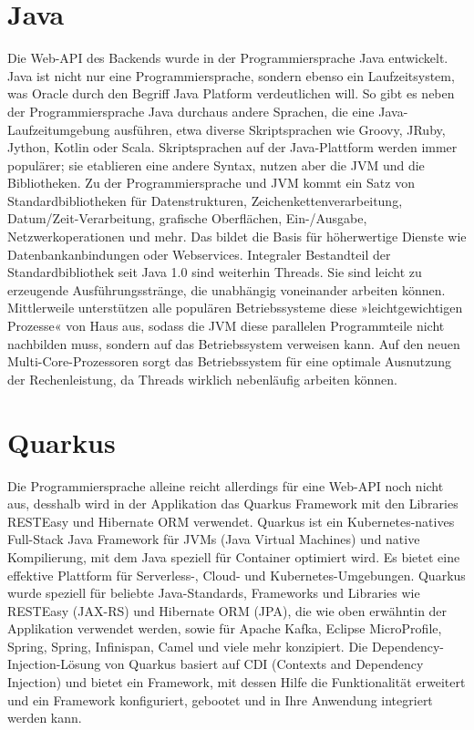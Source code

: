 \section{Java}

Die Web-API des Backends wurde in der Programmiersprache Java entwickelt.
Java ist nicht nur eine Programmiersprache, sondern ebenso ein Laufzeitsystem, was Oracle durch den Begriff Java Platform verdeutlichen will. 
So gibt es neben der Programmiersprache Java durchaus andere Sprachen, die eine Java-Laufzeitumgebung ausführen, etwa diverse Skriptsprachen wie 
Groovy, JRuby, Jython, Kotlin oder Scala. Skriptsprachen auf der Java-Plattform werden immer populärer; sie etablieren eine andere Syntax, nutzen aber die JVM und die Bibliotheken.
Zu der Programmiersprache und JVM kommt ein Satz von Standardbibliotheken für Datenstrukturen, Zeichenkettenverarbeitung, Datum/Zeit-Verarbeitung, grafische Oberflächen, 
Ein-/Ausgabe, Netzwerkoperationen und mehr. Das bildet die Basis für höherwertige Dienste wie Datenbankanbindungen oder Webservices. Integraler Bestandteil der Standardbibliothek 
seit Java 1.0 sind weiterhin Threads. Sie sind leicht zu erzeugende Ausführungsstränge, die unabhängig voneinander arbeiten können. 
Mittlerweile unterstützen alle populären Betriebssysteme diese »leichtgewichtigen Prozesse« von Haus aus, sodass die JVM diese parallelen Programmteile nicht nachbilden muss, 
sondern auf das Betriebssystem verweisen kann. Auf den neuen Multi-Core-Prozessoren sorgt das Betriebssystem für eine optimale Ausnutzung der Rechenleistung, da Threads wirklich nebenläufig arbeiten können.
\cite{sysarch-java-1}

\section{Quarkus}

Die Programmiersprache alleine reicht allerdings für eine Web-API noch nicht aus, desshalb wird in der Applikation das Quarkus Framework mit den Libraries RESTEasy und Hibernate ORM verwendet.
Quarkus ist ein Kubernetes-natives Full-Stack Java Framework für JVMs (Java Virtual Machines) und native Kompilierung, mit dem Java speziell für Container optimiert wird. 
Es bietet eine effektive Plattform für Serverless-, Cloud- und Kubernetes-Umgebungen. Quarkus wurde speziell für 
beliebte Java-Standards, Frameworks und Libraries wie RESTEasy (JAX-RS) und Hibernate ORM (JPA), die wie oben erwähntin der Applikation verwendet werden, 
sowie für Apache Kafka, Eclipse MicroProfile, Spring, Spring, Infinispan, Camel und viele mehr konzipiert.
Die Dependency-Injection-Lösung von Quarkus basiert auf CDI (Contexts and Dependency Injection) und bietet ein Framework, mit dessen Hilfe die Funktionalität 
erweitert und ein Framework konfiguriert, gebootet und in Ihre Anwendung integriert werden kann. 

